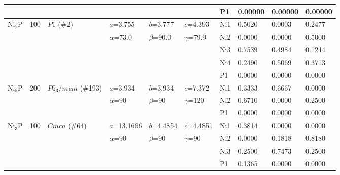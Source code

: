 \documentclass[twoside,twocolumn,9pt]{article}
\begin{document}
\begin{table}[t]
\begin{tabular*}{\textwidth}{@{\extracolsep{\fill}}llllllllll}
               &     &               &                  &                 &                  & P1  & 0.00000 & 0.00000 & 0.00000 \\
\midrule
    Ni$_{7}$P  & 100 & $P\bar{1}$ (\#2)     & $a$=3.755    & $b$=3.777   & $c$=4.393    & Ni1 &  0.5020 & 0.0003 & 0.2477 \\
               &     &               & $\alpha$=73.0 & $\beta$=90.0 & $\gamma$=79.9    & Ni2 &  0.0000 & 0.0000 & 0.5000 \\
               &     &               &                  &                 &                  & Ni3 &  0.7539 & 0.4984 & 0.1244 \\
               &     &               &                  &                 &                  & Ni4 &  0.2490 & 0.5069 & 0.3713 \\
               &     &               &                  &                 &                  & P1  &  0.0000 & 0.0000 & 0.0000 \\
\midrule
    Ni$_{5}$P  & 200 & $P6_3/mcm$ (\#193)  & $a$=3.934    & $b$=3.934   & $c$=7.372      & Ni1 & 0.3333   &  0.6667  &   0.0000  \\
               &     &                    & $\alpha$=90   & $\beta$=90 & $\gamma$=120       & Ni2 & 0.6710   &  0.0000  &   0.2500  \\
               &     &                    &                  &                 &                  & P1 &  0.0000    & 0.0000   &  0.0000  \\
\midrule
    Ni$_{3}$P  & 100 & $Cmca$ (\#64) & $a$=13.1666   & $b$=4.4854   & $c$=4.4851    & Ni1          & 0.3814   &  0.0000  &   0.0000  \\
               &     &               & $\alpha$=90   & $\beta$=90   & $\gamma$=90   & Ni2 & 0.0000   &  0.1818  &   0.8180  \\
               &     &               &                  &                 &                  & Ni3 & 0.2500   &  0.7473  &   0.2500  \\   
               &     &               &                  &                 &                  & P1 &  0.1365    & 0.0000   &  0.0000  \\

\end{tabular*}
\end{table}
\end{document}
